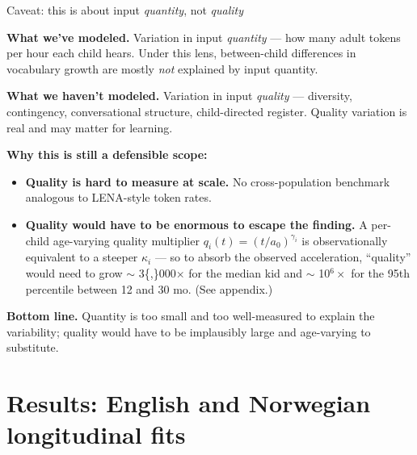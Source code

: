 \documentclass[
  ignorenonframetext,
  aspectratio=169,
  t]{beamer}
\providecommand{\tightlist}{%
  \setlength{\itemsep}{0pt}\setlength{\parskip}{0pt}}
\begin{document}
\begin{frame}{Caveat: this is about input \emph{quantity}, not
\emph{quality}}
\label{caveat-this-is-about-input-quantity-not-quality}
\footnotesize

\textbf{What we've modeled.} Variation in input \emph{quantity} --- how
many adult tokens per hour each child hears. Under this lens,
between-child differences in vocabulary growth are mostly \emph{not}
explained by input quantity.

\vspace{0.4em}

\textbf{What we haven't modeled.} Variation in input \emph{quality} ---
diversity, contingency, conversational structure, child-directed
register. Quality variation is real and may matter for learning.

\vspace{0.4em}

\textbf{Why this is still a defensible scope:}

\begin{itemize}
\tightlist
\item
  \textbf{Quality is hard to measure at scale.} No cross-population
  benchmark analogous to LENA-style token rates.
\item
  \textbf{Quality would have to be enormous to escape the finding.} A
  per-child age-varying quality multiplier
  \(q_i(t) = (t/a_0)^{\gamma_i}\) is observationally equivalent to a
  steeper \(\kappa_i\) --- so to absorb the observed acceleration,
  ``quality'' would need to grow \(\sim\) 3\{,\}000\(\times\) for the
  median kid and \(\sim\) 10\(^6\times\) for the 95th percentile between
  12 and 30 mo. (See appendix.)
\end{itemize}

\vspace{0.3em}

\textbf{Bottom line.} Quantity is too small and too well-measured to
explain the variability; quality would have to be implausibly large and
age-varying to substitute.
\end{frame}

\section{Results: English and Norwegian longitudinal
fits}\label{results-english-and-norwegian-longitudinal-fits}
\end{document}
